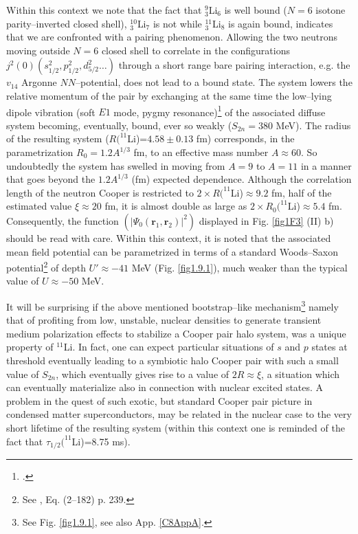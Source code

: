  Within this context we note that the fact that $^9_3$Li$_6$ is well bound ($N=6$ isotone parity--inverted closed shell), $^{10}_3$Li$_7$ is not while $^{11}_3$Li$_8$ is again bound, indicates that we are confronted with a pairing phenomenon. Allowing the two neutrons moving outside $N=6$ closed shell to correlate in the configurations $j^2(0) (s_{1/2}^2, p_{1/2}^2, d_{5/2}^2\dots)$ through a short range bare pairing interaction, e.g. the $v_{14}$ Argonne $NN$--potential, does not lead to a bound state. The system lowers the relative momentum of the pair by exchanging at the same time the low--lying dipole vibration (soft $E1$ mode, pygmy resonance)\footnote{\cite{Broglia:19}.} of the associated diffuse system becoming, eventually, bound, ever so weakly ($S_{2n}=380$ MeV). The radius of the resulting system ($R(^{11}$Li)=$4.58\pm 0.13$ fm) corresponds, in the parametrization $R_0=1.2 A^{1/3}$ fm, to an effective mass number $A\approx 60$. So undoubtedly the system has swelled in moving from $A=9$ to $A=11$ in a manner that goes beyond the $1.2A^{1/3}$ (fm) expected dependence. Although the correlation length of the neutron Cooper is restricted to $2\times R(^{11}$Li)$\approx 9.2$ fm, half of the estimated value $\xi\approx 20$ fm, it is almost double as large as $2\times R_0(^{11}$Li)$\approx 5.4$ fm. Consequently, the function $(|\Psi_0(\mathbf r_1,\mathbf r_2)|^2)$ displayed  in Fig. \ref{fig1F3} (II) b) should be read with care.
Within this context, it is  noted that the associated mean field potential can be parametrized in terms of a standard Woods--Saxon potential\footnote{See \cite{Bohr:69}, Eq. (2--182) p. 239.} of depth $U'\approx-41$ MeV (Fig. \ref{fig1.9.1}), much weaker than the typical value of $U\approx-50$ MeV.

It will be surprising if the above mentioned  bootstrap--like mechanism\footnote{See Fig. \ref{fig1.9.1}, see also App. \ref{C8AppA}.}  namely that of profiting from  low, unstable, nuclear densities to generate transient medium polarization effects to stabilize a Cooper pair halo system, was a unique property of $^{11}$Li. In fact, one can expect particular situations of $s$ and $p$ states at threshold eventually leading to a symbiotic halo Cooper pair with such a small value of $S_{2n}$, which  eventually gives rise to a value of $2R\approx\xi$, a situation which can eventually materialize also in connection with  nuclear excited states. A problem in the quest of such exotic, but standard Cooper pair picture in condensed matter superconductors, may be related in the nuclear case to the very short lifetime of the resulting system (within this context one is reminded of the fact that $\tau_{1/2}(^{11}$Li)=8.75 ms).


